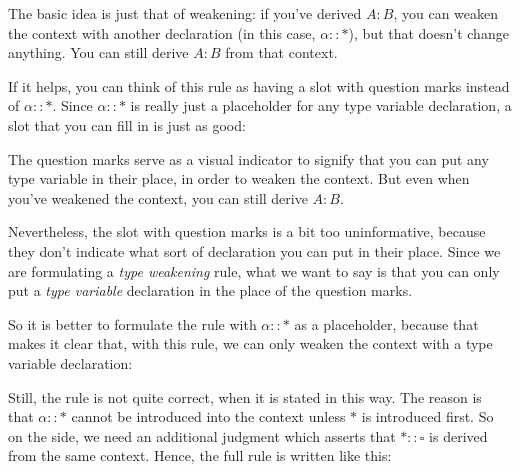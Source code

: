 \documentclass{book}
\numberwithin{equation}{chapter}
\begin{document}
\begin{prooftree}
\end{prooftree}

\noindent
The basic idea is just that of weakening: if you've derived $A : B$, you can weaken the context with another declaration (in this case, $\alpha :: \ast$), but that doesn't change anything. You can still derive $A : B$ from that context.

If it helps, you can think of this rule as having a slot with question marks instead of $\alpha :: \ast$. Since $\alpha :: \ast$ is really just a placeholder for any type variable declaration, a slot that you can fill in is just as good:

\begin{prooftree}
\end{prooftree}

\noindent
The question marks serve as a visual indicator to signify that you can put any type variable in their place, in order to weaken the context. But even when you've weakened the context, you can still derive $A : B$.

Nevertheless, the slot with question marks is a bit too uninformative, because they don't indicate what sort of declaration you can put in their place. Since we are formulating a \textit{type weakening} rule, what we want to say is that you can only put a \textit{type variable} declaration in the place of the question marks. 

So it is better to formulate the rule with $\alpha :: \ast$ as a placeholder, because that makes it clear that, with this rule, we can only weaken the context with a type variable declaration:

\begin{prooftree}
\end{prooftree}

\noindent
Still, the rule is not quite correct, when it is stated in this way. The reason is that $\alpha :: \ast$ cannot be introduced into the context unless $\ast$ is introduced first. So on the side, we need an additional judgment which asserts that $\ast :: \square$ is derived from the same context. Hence, the full rule is written like this:
\end{document}
